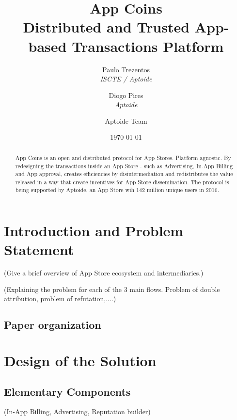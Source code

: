 \documentclass[12pt, a4paper, twoside, titlepage]{article}
\title{App Coins \\ Distributed and Trusted App-based Transactions Platform}
\author{Paulo Trezentos  \\
  {\em ISCTE / Aptoide}  \\
  \and 
  Diogo Pires \\
  {\em Aptoide} \\
  \and
  Aptoide Team
  }
\date{\today}
\begin{document}
\maketitle


\begin{abstract}
App Coins is an open and distributed protocol for App Stores. Platform agnostic. 
By redesigning the transactions inside an App Store - such as Advertising, In-App Billing and App approval, creates efficiencies by disintermediation and redistributes the value released in a way that create incentives for App Store dissemination.
The protocol is being supported by Aptoide, an App Store wih 142 million unique users in 2016. 
\end{abstract}




\section{Introduction and Problem Statement}

(Give a brief overview of App Store ecosystem and intermediaries.) 

(Explaining the problem for each of the 3 main flows. Problem of double attribution, problem of refutation,....)

\subsection{Paper organization}

\section{Design of the Solution}

\subsection{Elementary Components}

(In-App Billing, Advertising, Reputation builder) 
\end{document}

